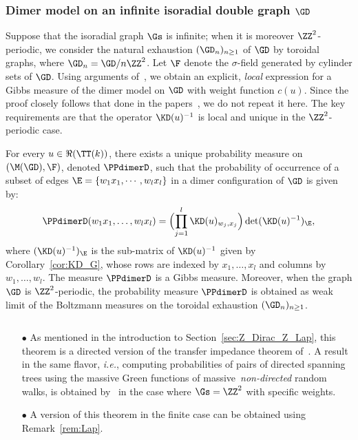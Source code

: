 \documentclass[a4paper,twoside,11pt]{article}
\begin{document}
\subsubsection{Dimer model on an infinite isoradial double graph $\GD$}

Suppose that the isoradial graph $\Gs$ is infinite; when it is moreover $\ZZ^2$-periodic, we consider the 
natural exhaustion $(\GD_n)_{n\geq 1}$ of $\GD$ by toroidal graphs, where $\GD_n=\GD/n\ZZ^2$. 
Let $\F$ denote the $\sigma$-field generated by cylinder sets of $\GD$.
Using arguments of~\cite{CKP,KOS,deTiliere:quadri},
we obtain an explicit, \emph{local} expression for a Gibbs measure of the dimer model on $\GD$ with 
weight function $c(u)$. Since the proof closely follows that done in the papers~\cite{deTiliere:quadri,BoutillierdeTiliere:iso_gen,BdtR2}, we do not
repeat it here. The key requirements are that the operator $\KD(u)^{-1}$ is local and unique in 
the $\ZZ^2$-periodic case.

\begin{thm}\label{thm:Gibbs_KD}
For every $u\in\Re(\TT(k))$,
there exists a unique probability measure on $(\M(\GD),\F)$, denoted $\PPdimerD$, such that the probability of occurrence of a subset of edges 
$\E=\{w_1x_1,\cdots,w_lx_l\}$ in a dimer configuration of $\GD$ is given by:
\begin{equation*}
\PPdimerD(w_1x_1,\dots,w_lx_l)=\Bigl(\prod_{j=1}^l \KD(u)_{w_j,x_j}\Bigr)\det(\KD(u)^{-1})_\E,
\end{equation*}
where $(\KD(u)^{-1})_\E$ is the sub-matrix of $\KD(u)^{-1}$ given by Corollary~\ref{cor:KD_G}, whose rows are indexed by $x_1,\dots,x_l$
and columns by $w_1,\dots,w_l$. The measure $\PPdimerD$ is a Gibbs measure.
Moreover, when the graph $\GD$ is $\ZZ^2$-periodic, the probability measure $\PPdimerD$ is obtained as weak limit of the 
Boltzmann measures on the toroidal exhaustion $(\GD_n)_{n\geq 1}$.
\end{thm}
\begin{rem}$\,$
\begin{itemize}
\item[$\bullet$] As mentioned in the introduction to Section~\ref{sec:Z_Dirac_Z_Lap}, this theorem is a directed version of the 
transfer impedance theorem of~\cite{BurtonPemantle}. A result in the same flavor, \emph{i.e.}, computing probabilities of 
pairs of directed spanning trees using the massive Green functions of massive~\emph{non-directed} random walks, is obtained 
by~\cite{Chhita} in the case where $\Gs=\ZZ^2$ with specific weights.
\item[$\bullet$] A version of this theorem in the finite case can be obtained using Remark~\ref{rem:Lap}.
\end{itemize}
\end{rem}
\end{document}
